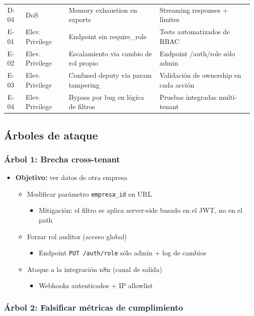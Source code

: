 \documentclass[12pt,a4paper,oneside]{article}
\begin{document}
\begin{longtable}{p{1cm}p{2cm}p{5cm}p{5cm}}
D-04 & DoS & Memory exhaustion en exports & Streaming responses + límites \\
E-01 & Elev. Privilege & Endpoint sin require\_role & Tests automatizados de RBAC \\
E-02 & Elev. Privilege & Escalamiento via cambio de rol propio & Endpoint /auth/role sólo admin \\
E-03 & Elev. Privilege & Confused deputy via param tampering & Validación de ownership en cada acción \\
E-04 & Elev. Privilege & Bypass por bug en lógica de filtros & Pruebas integradas multi-tenant \\
\bottomrule
\end{longtable}

\subsection{Árboles de ataque}

\subsubsection{Árbol 1: Brecha cross-tenant}

\begin{itemize}[leftmargin=*]
  \item \textbf{Objetivo:} ver datos de otra empresa
  \begin{itemize}
    \item Modificar parámetro \texttt{empresa\_id} en URL
    \begin{itemize}
      \item Mitigación: el filtro se aplica server-side basado en el JWT, no en el path
    \end{itemize}
    \item Forzar rol auditor (acceso global)
    \begin{itemize}
      \item Endpoint \texttt{PUT /auth/role} sólo admin + log de cambios
    \end{itemize}
    \item Ataque a la integración n8n (canal de salida)
    \begin{itemize}
      \item Webhooks autenticados + IP allowlist
    \end{itemize}
  \end{itemize}
\end{itemize}

\subsubsection{Árbol 2: Falsificar métricas de cumplimiento}
\end{document}
